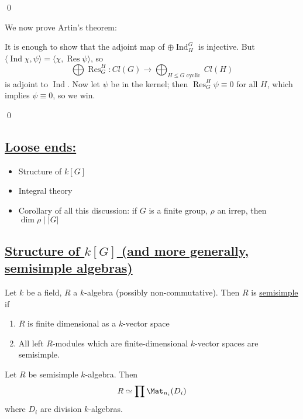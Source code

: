 \documentclass[x11names,reqno,14pt]{extarticle}
\DeclareMathOperator{\Res}{Res}
\DeclareMathOperator{\Ind}{Ind}
\begin{document}
\qed

We now prove Artin's theorem:

\proof

It is enough to show that the adjoint map of $\oplus\Ind_H^G$ is injective. But $\langle \Ind \chi, \psi \rangle = \langle \chi, \Res \psi \rangle$, so 
\[
\bigoplus\Res_G^H :Cl(G) \to \bigoplus_{H\leq G\text{ cyclic }}Cl(H)
\]
is adjoint to $\Ind$. Now let $\psi$ be in the kernel; then $\Res_G^H\psi \equiv 0$ for all $H$, which implies $\psi \equiv 0$, so we win. 

\qed

\subsection*{\underline{Loose ends:}}

\begin{itemize}

\item Structure of $k[G]$

\item Integral theory

\item Corollary of all this discussion: if $G$ is a finite group, $\rho$ an irrep, then $\dim\rho \mid |G|$

\end{itemize}

\subsection*{\underline{Structure of $k[G]$ (and more generally, semisimple algebras)}}


Let $k$ be a field, $R$ a $k$-algebra (possibly non-commutative). Then $R$ is \underline{semisimple} if 
\,
\begin{enumerate}

\item $R$ is finite dimensional as a $k$-vector space

\item All left $R$-modules which are finite-dimensional $k$-vector spaces are semisimple. 

\end{enumerate}

\thm

Let $R$ be semisimple $k$-algebra. Then 
\[
R \simeq \prod\Mat_{n_i}(D_i)
\]
where $D_i$ are division $k$-algebras.
\end{document}
